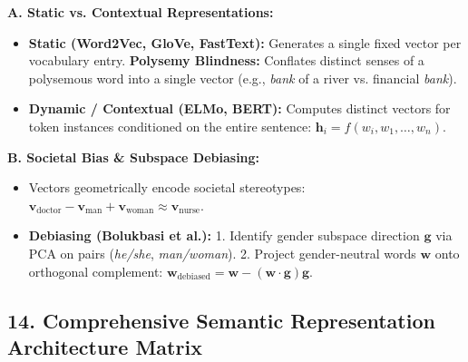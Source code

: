\documentclass[10pt,a4paper]{article}
\begin{document}
\noindent\begin{minipage}[t]{0.485\textwidth}
\textbf{A. Static vs. Contextual Representations:}
\begin{itemize}[leftmargin=10pt,topsep=1pt,itemsep=1pt]
    \footnotesize
    \item \textbf{Static (Word2Vec, GloVe, FastText):} Generates a single fixed vector per vocabulary entry. \textbf{Polysemy Blindness:} Conflates distinct senses of a polysemous word into a single vector (e.g., \textit{bank} of a river vs. financial \textit{bank}).
    \item \textbf{Dynamic / Contextual (ELMo, BERT):} Computes distinct vectors for token instances conditioned on the entire sentence: $\mathbf{h}_i = f(w_i, w_1, \dots, w_n)$.
\end{itemize}
\end{minipage}\hfill
\begin{minipage}[t]{0.485\textwidth}
\textbf{B. Societal Bias \& Subspace Debiasing:}
\begin{itemize}[leftmargin=10pt,topsep=1pt,itemsep=1pt]
    \footnotesize
    \item Vectors geometrically encode societal stereotypes:
    $\mathbf{v}_{\text{doctor}} - \mathbf{v}_{\text{man}} + \mathbf{v}_{\text{woman}} \approx \mathbf{v}_{\text{nurse}}$.
    \item \textbf{Debiasing (Bolukbasi et al.):}
    1. Identify gender subspace direction $\mathbf{g}$ via PCA on pairs (\textit{he/she}, \textit{man/woman}).
    2. Project gender-neutral words $\mathbf{w}$ onto orthogonal complement: $\mathbf{w}_{\text{debiased}} = \mathbf{w} - (\mathbf{w} \cdot \mathbf{g})\mathbf{g}$.
\end{itemize}
\end{minipage}

\vspace{1pt}
\subsection*{\color{themeblue} 14. Comprehensive Semantic Representation Architecture Matrix}
\vspace{-2pt}
\end{document}
